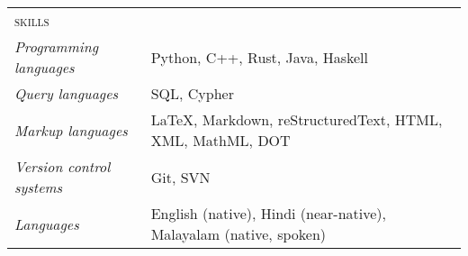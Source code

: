 \newcommand\skill[2]{%
  \emph{#1} & #2\\
}
\begin{tabularx}{\linewidth}{lX}
  \addlinespace\addlinespace
  {\Large\textsc{\MakeTextLowercase{Skills}}}\\\addlinespace
  \midrule
  \skill{Programming languages}{Python, C++, Rust, Java, Haskell}
  \skill{Query languages}{SQL, Cypher}
  \skill{Markup languages}{\LaTeX, Markdown, reStructuredText, HTML, XML, MathML, DOT}
  \skill{Version control systems}{Git, SVN}
  \skill{Languages}{English (native), Hindi (near-native), Malayalam (native, spoken)}
\end{tabularx}
